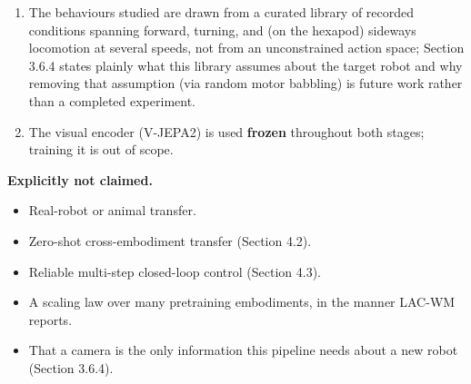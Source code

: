 \documentclass[12pt,a4paper,oneside]{report}
\begin{document}
\begin{enumerate}[label=\arabic*.]
  robot's own body, so it exposes far less of this same redundancy, not less redundancy overall -- it is the
  setting in which the small remaining action-dependent signal becomes measurable and the model is shown to use
  the action at all.
\item The behaviours studied are drawn from a curated library of recorded conditions spanning forward, turning,
  and (on the hexapod) sideways locomotion at several speeds, not from an unconstrained action space; Section 3.6.4
  states plainly what this library assumes about the target robot and why removing that assumption (via random
  motor babbling) is future work rather than a completed experiment.
\item The visual encoder (V-JEPA2) is used \textbf{frozen} throughout both stages; training it is out of scope.
\end{enumerate}

\noindent\textbf{Explicitly not claimed.}
\begin{itemize}[label=--]
\item Real-robot or animal transfer.
\item Zero-shot cross-embodiment transfer (Section 4.2).
\item Reliable multi-step closed-loop control (Section 4.3).
\item A scaling law over many pretraining embodiments, in the manner LAC-WM reports.
\item That a camera is the only information this pipeline needs about a new robot (Section 3.6.4).
\end{itemize}
\end{document}
